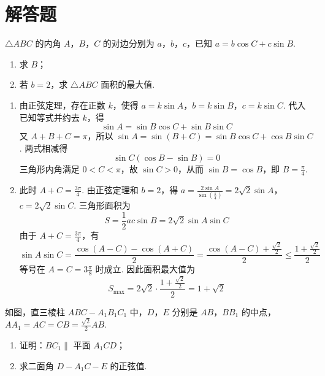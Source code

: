 \section{解答题}

\begin{problem}
\(\triangle ABC\) 的内角 \(A\)，\(B\)，\(C\) 的对边分别为 \(a\)，\(b\)，\(c\)，已知 \(a = b\cos C + c\sin B\).
\begin{enumerate}
\item 求 \(B\)；
\item 若 \(b = 2\)，求 \(\triangle ABC\) 面积的最大值.
\end{enumerate}
\end{problem}

\begin{solution}
\begin{enumerate}
\item 由正弦定理，存在正数 \(k\)，使得 \(a=k\sin A\)，\(b=k\sin B\)，\(c=k\sin C\). 代入已知等式并约去 \(k\)，得
\[
\sin A=\sin B\cos C+\sin B\sin C
\]
又 \(A+B+C=\pi\)，所以 \(\sin A=\sin(B+C)=\sin B\cos C+\cos B\sin C\). 两式相减得
\[
\sin C(\cos B-\sin B)=0
\]
三角形内角满足 \(0<C<\pi\)，故 \(\sin C>0\)，从而 \(\sin B=\cos B\)，即 \(B=\frac\pi4\).

\item 此时 \(A+C=\frac{3\pi}{4}\). 由正弦定理和 \(b=2\)，得
\(a=\frac{2\sin A}{\sin(\frac{\pi}{4})}=2\sqrt2\sin A\)，\(c=2\sqrt2\sin C\).
三角形面积为
\[
S=\frac12ac\sin B=2\sqrt2\sin A\sin C
\]
由于 \(A+C=\frac{3\pi}{4}\)，有
\[
\sin A\sin C=\frac{\cos(A-C)-\cos(A+C)}2
=\frac{\cos(A-C)+\frac{\sqrt2}{2}}2
\leqslant\frac{1+\frac{\sqrt2}{2}}2
\]
等号在 \(A=C=3\frac{\pi}{8}\) 时成立. 因此面积最大值为
\[
S_{\max}=2\sqrt2\cdot\frac{1+\frac{\sqrt2}{2}}2=1+\sqrt2
\]
\end{enumerate}
\end{solution}

\begin{problem}
如图，直三棱柱 \(ABC - A_1B_1C_1\) 中，\(D\)，\(E\) 分别是 \(AB\)，\(BB_1\) 的中点，\(AA_1 = AC = CB = \frac{\sqrt{2}}{2}AB\).
\begin{enumerate}
\item 证明：\(BC_1 \parallel\) 平面 \(A_1CD\)；
\item 求二面角 \(D - A_1C - E\) 的正弦值.
\end{enumerate}

\end{problem}

